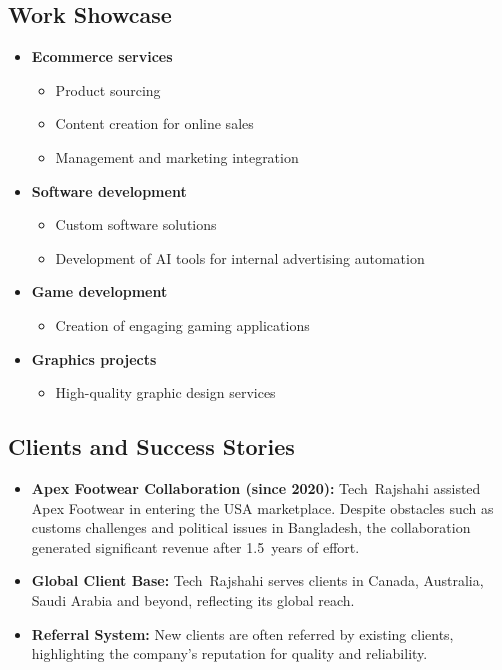 \documentclass[12pt,a4paper]{article}
\begin{document}
\subsection{Work Showcase}

\begin{itemize}
    \item \textbf{Ecommerce services}
    \begin{itemize}
        \item Product sourcing
        \item Content creation for online sales
        \item Management and marketing integration
    \end{itemize}

    \item \textbf{Software development}
    \begin{itemize}
        \item Custom software solutions
        \item Development of AI tools for internal advertising automation
    \end{itemize}

    \item \textbf{Game development}
    \begin{itemize}
        \item Creation of engaging gaming applications
    \end{itemize}

    \item \textbf{Graphics projects}
    \begin{itemize}
        \item High-quality graphic design services
    \end{itemize}
\end{itemize}

\subsection{Clients and Success Stories}
\begin{itemize}
    \item \textbf{Apex Footwear Collaboration (since 2020):} Tech Rajshahi assisted Apex Footwear in entering the USA marketplace.  Despite obstacles such as customs challenges and political issues in Bangladesh, the collaboration generated significant revenue after 1.5 years of effort.
    \item \textbf{Global Client Base:} Tech Rajshahi serves clients in Canada, Australia, Saudi Arabia and beyond, reflecting its global reach.
    \item \textbf{Referral System:} New clients are often referred by existing clients, highlighting the company’s reputation for quality and reliability.
\end{itemize}
\end{document}

